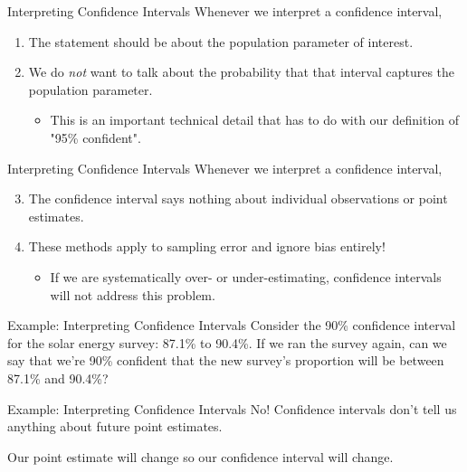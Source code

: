 \begin{frame}{Interpreting Confidence Intervals}
    Whenever we interpret a confidence interval,
    \begin{enumerate}
        \item The statement should be about the population parameter of interest.
        \item We do \textit{not} want to talk about the probability that that interval captures the population parameter.
        \begin{itemize}
            \item This is an important technical detail that has to do with our definition of "95\% confident".
        \end{itemize}
    \end{enumerate}
\end{frame}

\begin{frame}{Interpreting Confidence Intervals}
    Whenever we interpret a confidence interval,
    \begin{enumerate}\setcounter{enumi}{2}
        \item The confidence interval says nothing about individual observations or point estimates.
        \item These methods apply to sampling error and ignore bias entirely!
        \begin{itemize}
            \item If we are systematically over- or under-estimating, confidence intervals will not address this problem.
        \end{itemize}
    \end{enumerate}
\end{frame}

\begin{frame}{Example: Interpreting Confidence Intervals}
    Consider the 90\% confidence interval for the solar energy survey: 87.1\% to 90.4\%. If we ran the survey again, can we say that we’re 90\% confident that the new survey’s proportion will be between 87.1\% and 90.4\%?
\end{frame}

\begin{frame}{Example: Interpreting Confidence Intervals}
    No! Confidence intervals don't tell us anything about future point estimates.
    
    \vspace{12pt}Our point estimate will change so our confidence interval will change.
\end{frame}